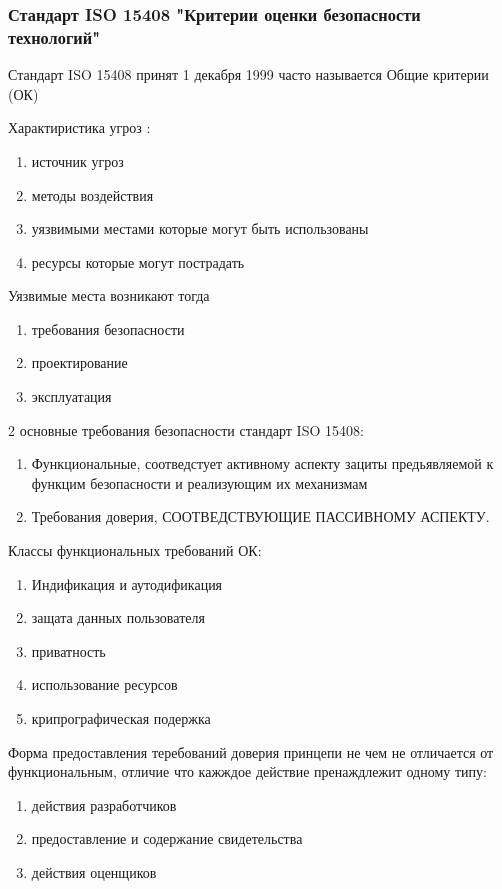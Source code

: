 \documentclass[a4paper,12pt]{extarticle}
\begin{document}
	\subsubsection{Стандарт ISO 15408 "Критерии оценки безопасности технологий"}
	
	Стандарт ISO 15408 принят 1 декабря 1999 часто называется Общие критерии (ОК)
	
	Характиристика угроз :
	\begin{enumerate}
		\item источник угроз
		\item методы воздействия
		\item уязвимыми местами которые могут быть использованы
		\item ресурсы которые могут пострадать
	\end{enumerate} 
	Уязвимые места возникают тогда
	\begin{enumerate}
		\item требования безопасности 
		\item проектирование 
		\item эксплуатация
	\end{enumerate}

	2 основные требования безопасности стандарт ISO 15408:
	\begin{enumerate}
		\item Функциональные, соотведстует активному аспекту зациты предьявляемой к функцим безопасности и реализующим их механизмам
		\item Требования доверия, СООТВЕДСТВУЮЩИЕ ПАССИВНОМУ АСПЕКТУ.
	\end{enumerate}
	Классы функциональных требований ОК:
	\begin{enumerate}
		\item Индификация и аутодификация
		\item защата данных пользователя
		\item приватность 
		\item использование ресурсов
		\item крипрографическая подержка
	\end{enumerate}
	
	Форма предоставления теребований доверия принцепи не чем не отличается от функциональным, отличие что кажждое действие пренаждлежит одному типу:
	\begin{enumerate}
		\item действия разработчиков
		\item предоставление и содержание свидетельства
		\item действия оценщиков
	\end{enumerate}
\end{document}
